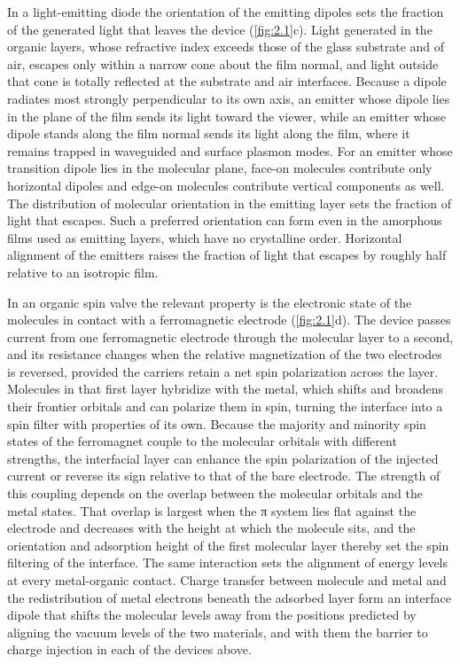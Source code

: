 In a light-emitting diode the orientation of the emitting dipoles sets the fraction of the generated light that leaves the device (\cref{fig:2.1}c). Light generated in the organic layers, whose refractive index exceeds those of the glass substrate and of air, escapes only within a narrow cone about the film normal, and light outside that cone is totally reflected at the substrate and air interfaces. Because a dipole radiates most strongly perpendicular to its own axis, an emitter whose dipole lies in the plane of the film sends its light toward the viewer, while an emitter whose dipole stands along the film normal sends its light along the film, where it remains trapped in waveguided and surface plasmon modes. For an emitter whose transition dipole lies in the molecular plane, face-on molecules contribute only horizontal dipoles and edge-on molecules contribute vertical components as well. The distribution of molecular orientation in the emitting layer sets the fraction of light that escapes. Such a preferred orientation can form even in the amorphous films used as emitting layers, which have no crystalline order. Horizontal alignment of the emitters raises the fraction of light that escapes by roughly half relative to an isotropic film.\autocite{yokoyamaMolecularOrientationSmallmolecule2011,bruttingDeviceEfficiencyOrganic2013}

In an organic spin valve the relevant property is the electronic state of the molecules in contact with a ferromagnetic electrode (\cref{fig:2.1}d). The device passes current from one ferromagnetic electrode through the molecular layer to a second, and its resistance changes when the relative magnetization of the two electrodes is reversed, provided the carriers retain a net spin polarization across the layer. Molecules in that first layer hybridize with the metal, which shifts and broadens their frontier orbitals and can polarize them in spin, turning the interface into a spin filter with properties of its own. Because the majority and minority spin states of the ferromagnet couple to the molecular orbitals with different strengths, the interfacial layer can enhance the spin polarization of the injected current or reverse its sign relative to that of the bare electrode.\autocite{sanvitoRiseSpinterfaceScience2010,barraudUnravellingRoleInterface2010} The strength of this coupling depends on the overlap between the molecular orbitals and the metal states. That overlap is largest when the π system lies flat against the electrode and decreases with the height at which the molecule sits, and the orientation and adsorption height of the first molecular layer thereby set the spin filtering of the interface. The same interaction sets the alignment of energy levels at every metal-organic contact. Charge transfer between molecule and metal and the redistribution of metal electrons beneath the adsorbed layer form an interface dipole that shifts the molecular levels away from the positions predicted by aligning the vacuum levels of the two materials, and with them the barrier to charge injection in each of the devices above.\autocite{ishiiEnergyLevelAlignment1999}


